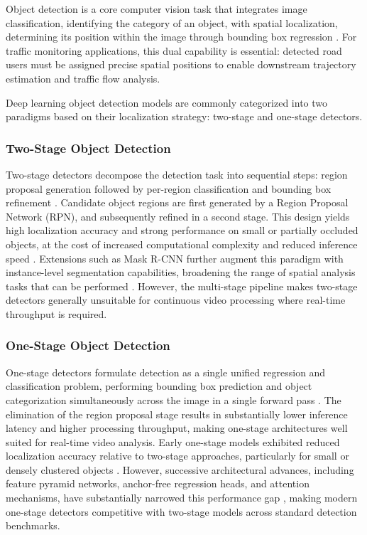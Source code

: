 Object detection is a core computer vision task that integrates image classification, identifying the category of an object, with spatial localization, determining its position within the image through bounding box regression \citep{Zhao2019}. For traffic monitoring applications, this dual capability is essential: detected road users must be assigned precise spatial positions to enable downstream trajectory estimation and traffic flow analysis.

Deep learning object detection models are commonly categorized into two paradigms based on their localization strategy: two-stage and one-stage detectors.

\subsubsection{Two-Stage Object Detection}

Two-stage detectors decompose the detection task into sequential steps: region proposal generation followed by per-region classification and bounding box refinement \citep{Girshick2014, Ren2015}. Candidate object regions are first generated by a Region Proposal Network (RPN), and subsequently refined in a second stage. This design yields high localization accuracy and strong performance on small or partially occluded objects, at the cost of increased computational complexity and reduced inference speed \citep{Zhao2019}. Extensions such as Mask R-CNN further augment this paradigm with instance-level segmentation capabilities, broadening the range of spatial analysis tasks that can be performed \citep{He2017}. However, the multi-stage pipeline makes two-stage detectors generally unsuitable for continuous video processing where real-time throughput is required.

\subsubsection{One-Stage Object Detection}

One-stage detectors formulate detection as a single unified regression and classification problem, performing bounding box prediction and object categorization simultaneously across the image in a single forward pass \citep{Redmon2016, Liu2016}. The elimination of the region proposal stage results in substantially lower inference latency and higher processing throughput, making one-stage architectures well suited for real-time video analysis. Early one-stage models exhibited reduced localization accuracy relative to two-stage approaches, particularly for small or densely clustered objects \citep{Zhao2019}. However, successive architectural advances, including feature pyramid networks, anchor-free regression heads, and attention mechanisms, have substantially narrowed this performance gap \citep{Bochkovskiy2020}, making modern one-stage detectors competitive with two-stage models across standard detection benchmarks.

